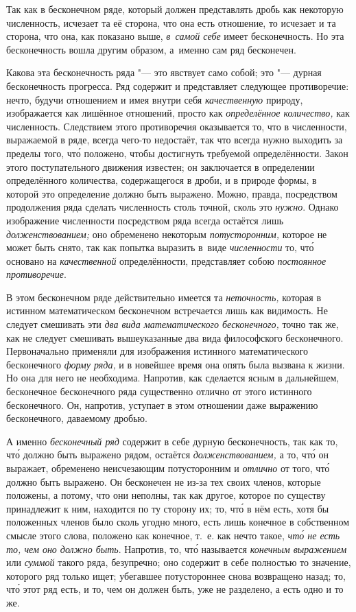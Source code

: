 Так как в бесконечном ряде, который должен представлять дробь как некоторую
численность, исчезает та её сторона, что она есть отношение, то исчезает и та
сторона, что она, как показано выше, {\em в~самой себе} имеет бесконечность. Но
эта бесконечность вошла другим образом, а~именно сам ряд бесконечен.

Какова эта бесконечность ряда "--- это явствует само собой; это "--- дурная
бесконечность прогресса. Ряд содержит и представляет следующее
противоречие: нечто, будучи отношением и имея внутри себя
{\em качественную} природу, изображается как лишённое отношений, просто как
{\em определённое количество,} как численность. Следствием
этого противоречия оказывается то, что в численности, выражаемой в ряде, всегда
чего-то недостаёт, так что всегда нужно выходить за пределы того, чт\'{о} положено,
чтобы достигнуть требуемой определённости. Закон этого поступательного движения
известен; он заключается в определении определённого количества, содержащегося
в дроби, и в природе формы, в которой это определение должно быть выражено. Можно,
правда, посредством продолжения ряда сделать численность столь точной,
сколь это {\em нужно}. Однако изображение численности посредством ряда всегда
остаётся лишь {\em долженствованием;} оно обременено некоторым
{\em потусторонним,} которое не может быть снято, так как попытка выразить в~виде
{\em численности} то, чт\'{о} основано на {\em качественной} определённости,
представляет собою {\em постоянное противоречие}.

\label{bkm:bm52a}В этом бесконечном ряде действительно имеется
та {\em неточность,} которая в истинном математическом бесконечном
встречается лишь как видимость. Не следует смешивать
эти {\em два вида математического бесконечного,} точно так же, как
не следует смешивать вышеуказанные два вида философского
бесконечного. Первоначально применяли для изображения истинного
математического бесконечного {\em форму ряда,} и в новейшее время она опять
была вызвана к жизни. Но она для него не необходима. Напротив, как сделается
ясным в дальнейшем, бесконечное бесконечного ряда существенно отлично от этого
истинного бесконечного. Он, напротив, уступает в этом отношении даже выражению
бесконечного, даваемому дробью.

А именно {\em бесконечный ряд} содержит в себе дурную бесконечность, так как
то, чт\'{о} должно быть выражено рядом, остаётся {\em долженствованием,} а то,
чт\'{о} он выражает, обременено неисчезающим потусторонним и {\em отлично} от
того, чт\'{о} должно быть выражено. Он бесконечен не из-за тех своих членов,
которые положены, а потому, что они неполны, так как другое, которое по
существу принадлежит к ним, находится по ту сторону их; то, чт\'{о} в нём есть,
хотя бы положенных членов было сколь угодно много, есть лишь конечное в
собственном смысле этого слова, положено как конечное, т.~е. как нечто такое,
{\em чт\'{о} не есть то, чем оно должно быть}. Напротив, то, чт\'{о} называется
{\em конечным выражением} или {\em суммой} такого ряда, безупречно; оно
содержит в себе полностью то значение, которого ряд только ищет; убегавшее
потустороннее снова возвращено назад; то, чт\'{о} этот ряд есть, и то, чем он
должен быть, уже не разделено, а есть одно и то же.

